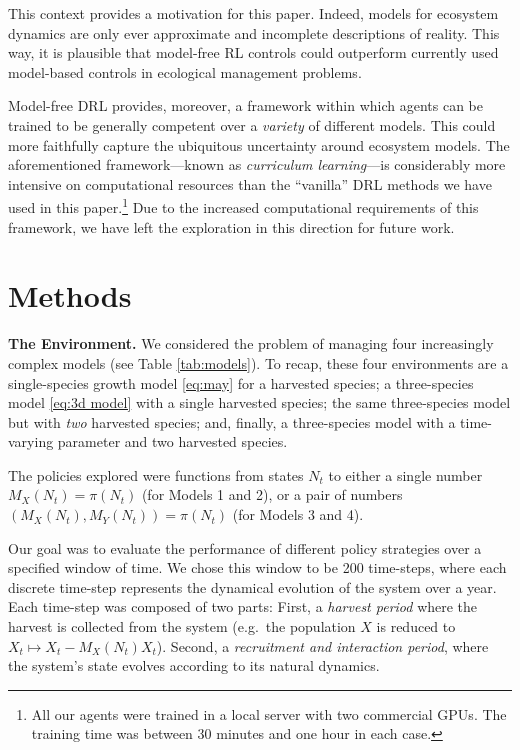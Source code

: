 \documentclass{article}
\begin{document}
This context provides a motivation for this paper. Indeed, models for
ecosystem dynamics are only ever approximate and incomplete descriptions
of reality. This way, it is plausible that model-free RL controls could
outperform currently used model-based controls in ecological management
problems.

Model-free DRL provides, moreover, a framework within which agents can
be trained to be generally competent over a \emph{variety} of different
models. This could more faithfully capture the ubiquitous uncertainty
around ecosystem models. The aforementioned framework---known as
\emph{curriculum learning}---is considerably more intensive on
computational resources than the ``vanilla'' DRL methods we have used in
this paper.\footnote{
All our agents were trained in a local server with two commercial GPUs. 
The training time was between 30 minutes and one hour in each case.
} Due to the increased computational requirements of this framework, we
have left the exploration in this direction for future work.

\hypertarget{methods}{%
\section{Methods}\label{methods}}

\textbf{The Environment.} We considered the problem of managing four
increasingly complex models (see Table \ref{tab:models}). To recap,
these four environments are a single-species growth model \eqref{eq:may}
for a harvested species; a three-species model \eqref{eq:3d model} with
a single harvested species; the same three-species model but with
\emph{two} harvested species; and, finally, a three-species model with a
time-varying parameter and two harvested species.

The policies explored were functions from states \(N_t\) to either a
single number \(M_X(N_t) = \pi(N_t)\) (for Models 1 and 2), or a pair of
numbers \((M_X(N_t), M_Y(N_t)) = \pi(N_t)\) (for Models 3 and 4).

Our goal was to evaluate the performance of different policy strategies
over a specified window of time. We chose this window to be 200
time-steps, where each discrete time-step represents the dynamical
evolution of the system over a year. Each time-step was composed of two
parts: First, a \emph{harvest period} where the harvest is collected
from the system (e.g.~the population \(X\) is reduced to
\(X_t\mapsto X_t - M_X(N_t) X_t\)). Second, a \emph{recruitment and
interaction period}, where the system's state evolves according to its
natural dynamics.
\end{document}
